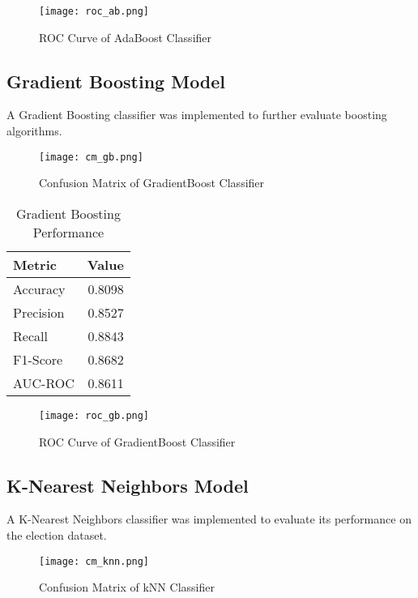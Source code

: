 \documentclass[12pt]{article}
\begin{document}
\begin{figure}[H]
    \centering
    \texttt{[image: roc\_ab.png]}
    \caption{ROC Curve of AdaBoost Classifier}
    \label{fig:example}
\end{figure}

\subsection{Gradient Boosting Model}
A Gradient Boosting classifier was implemented to further evaluate boosting algorithms.

\begin{figure}[H]
    \centering
    \texttt{[image: cm\_gb.png]}
    \caption{Confusion Matrix of GradientBoost Classifier}
    \label{fig:example}
\end{figure}

\begin{table}[H]
\centering
\caption{Gradient Boosting Performance}
\label{tab:gb_perf}
\begin{tabular}{lr}
\toprule
\textbf{Metric} & \textbf{Value} \\
\midrule
Accuracy & 0.8098 \\
Precision & 0.8527 \\
Recall & 0.8843 \\
F1-Score & 0.8682 \\
AUC-ROC & 0.8611 \\
\bottomrule
\end{tabular}
\end{table}

\begin{figure}[H]
    \centering
    \texttt{[image: roc\_gb.png]}
    \caption{ROC Curve of GradientBoost Classifier}
    \label{fig:example}
\end{figure}



\subsection{K-Nearest Neighbors Model}
A K-Nearest Neighbors classifier was implemented to evaluate its performance on the election dataset.

\begin{figure}[H]
    \centering
    \texttt{[image: cm\_knn.png]}
    \caption{Confusion Matrix of kNN Classifier}
    \label{fig:example}
\end{figure}
\end{document}
